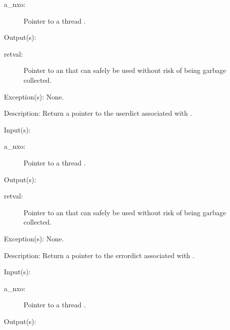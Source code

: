 \begin{capi}
\begin{capilist}
\begin{description}
		\item[a\_nxo: ]
			Pointer to a thread .
		\end{description}
	\item[Output(s): ]
		\begin{description}\item[]
		\item[retval: ]
			Pointer to an  that can safely be used
			without risk of being garbage collected.
		\end{description}
	\item[Exception(s): ] None.
	\item[Description: ]
		Return a pointer to the userdict associated with .
	\end{capilist}
\label{nxo_thread_errordict_get}
	\begin{capilist}
	\item[Input(s): ]
		\begin{description}\item[]
		\item[a\_nxo: ]
			Pointer to a thread .
		\end{description}
	\item[Output(s): ]
		\begin{description}\item[]
		\item[retval: ]
			Pointer to an  that can safely be used
			without risk of being garbage collected.
		\end{description}
	\item[Exception(s): ] None.
	\item[Description: ]
		Return a pointer to the errordict associated with .
	\end{capilist}
\label{nxo_thread_currenterror_get}
	\begin{capilist}
	\item[Input(s): ]
		\begin{description}\item[]
		\item[a\_nxo: ]
			Pointer to a thread \classname{nxo}.
		\end{description}
	\item[Output(s): ]

\end{capilist}
\end{capi}
